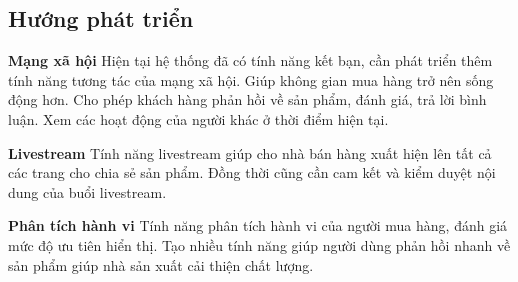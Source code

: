 \documentclass[11pt]{report}
\begin{document}
	\subsection*{Hướng phát triển}
	
	\textbf{Mạng xã hội} Hiện tại hệ thống đã có tính năng kết bạn, cần phát triển thêm tính năng tương tác của mạng xã hội. Giúp không gian mua hàng trở nên sống động hơn. Cho phép khách hàng phản hồi về sản phẩm, đánh giá, trả lời bình luận. Xem các hoạt động của người khác ở thời điểm hiện tại.
	
	\textbf{Livestream} Tính năng livestream giúp cho nhà bán hàng xuất hiện lên tất cả các trang cho chia sẻ sản phẩm. Đồng thời cũng cần cam kết và kiểm duyệt nội dung của buổi livestream.
	
	\textbf{Phân tích hành vi} Tính năng phân tích hành vi của người mua hàng, đánh giá mức độ ưu tiên hiển thị. Tạo nhiều tính năng giúp người dùng phản hồi nhanh về sản phẩm giúp nhà sản xuất cải thiện chất lượng.
	
	
	
	
\end{document}
